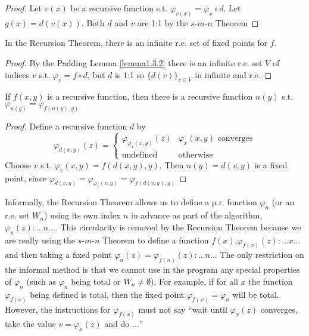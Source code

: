 \documentclass[11pt]{article}
\begin{document}
\begin{proof}
Let \(v(x)\) be a recursive function s.t.
\(\varphi_{v(x)}=\varphi_x\circ d\). Let \(g(x)=d(v(x))\). Both \(d\) and
\(v\) are 1:1 by the \(s\)-\(m\)-\(n\) Theorem
\end{proof}

\begin{proposition}[]
In the Recursion Theorem, there is an infinite r.e. set of fixed points for \(f\).
\end{proposition}

\begin{proof}
By the Padding Lemma \ref{lemma1.3.2} there is an infinite r.e. set \(V\) of
indices \(v\) s.t. \(\varphi_v=f\circ d\), but \(d\) is 1:1 so
\(\{d(v)\}_{v\in V}\) in infinite and r.e.
\end{proof}

\begin{theorem}
\label{thm2.3.5}
If \(f(x,y)\) is a recursive function, then there is a recursive function
\(n(y)\) s.t. \(\varphi_{n(y)}=\varphi_{f(n(y),y)}\)
\end{theorem}

\begin{proof}
Define a recursive function \(d\) by
\begin{equation*}
\varphi_{d(x,y)}(z)=
\begin{cases}
\varphi_{\varphi_x(x,y)}(z)&\varphi_x(x,y)\text{ converges}\\
\text{undefined}&\text{otherwise}
\end{cases}
\end{equation*}
Choose \(v\) s.t. \(\varphi_v(x,y)=f(d(x,y),y)\). Then \(n(y)=d(v,y)\) is a
fixed point, since \(\varphi_{d(v,y)}=\varphi_{\varphi_v(v,y)}=\varphi_{f(d(v,y),y)}\)
\end{proof}

Informally, the Recursion Theorem allows us to define a p.r. function
\(\varphi_n\) (or an r.e. set \(W_n\)) using its own index \(n\) in advance
as part of the algorithm, \(\varphi_n(z):\dots n\dots\). This circularity is
removed by the Recursion Theorem because we are really using the
\(s\)-\(m\)-\(n\) Theorem to define a function
\(f(x)\),\(\varphi_{f(x)}(z):\dots x\dots\) and then taking a fixed point
\(\varphi_n(z)=\varphi_{f(n)}(z):\dots n\dots\) The only restriction on the
informal method is that we cannot use in the program any special properties
of \(\varphi_n\) (such as \(\varphi_n\) being total or \(W_n\neq\emptyset\)).
For example, if for all \(x\) the function \(\varphi_{f(x)}\) being defined
is total, then the fixed point \(\varphi_{f(x)}=\varphi_n\) will be total.
However, the instructions for \(\varphi_{f(x)}\) must not say ``wait until
\(\varphi_{x}(z)\) converges, take the value \(v=\varphi_x(z)\) and do \(\dots\)''
\end{document}
